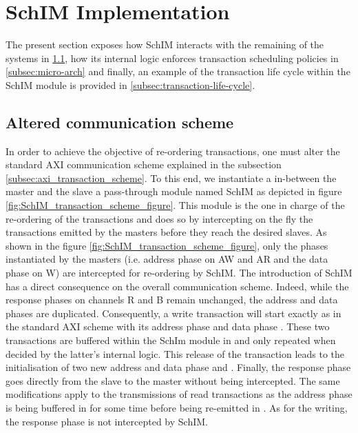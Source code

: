 \section{SchIM Implementation}
    \label{sec:schim_implmentation}

    The present section exposes how SchIM interacts with the remaining of the systems in \ref{subsec:communication-scheme}, how its internal logic enforces transaction scheduling policies in \ref{subsec:micro-arch} and finally, an example of the transaction life cycle within the SchIM module is provided in \ref{subsec:transaction-life-cycle}.

    \subsection{Altered communication scheme}
        \label{subsec:communication-scheme}
        In order to achieve the objective of re-ordering transactions, one must alter the standard AXI communication scheme explained in the subsection \ref{subsec:axi_transaction_scheme}.
        To this end, we instantiate a in-between the master and the slave a pass-through module named SchIM as depicted in figure \ref{fig:SchIM_transaction_scheme_figure}.
        This module is the one in charge of the re-ordering of the transactions and does so by intercepting on the fly the transactions emitted by the masters before they reach the desired slaves.
        As shown in the figure \ref{fig:SchIM_transaction_scheme_figure}, only the phases instantiated by the masters (i.e. address phase on AW and AR and the data phase on W) are intercepted for re-ordering by SchIM.
        The introduction of SchIM has a direct consequence on the overall communication scheme. Indeed, while the response phases on channels R and B remain unchanged, the address and data phases are duplicated.
        Consequently, a write transaction will start exactly as in the standard AXI scheme with its address phase  and data phase .
        These two transactions are buffered within the SchIm module in  and only repeated when decided by the latter's internal logic.
        This release of the transaction leads to the initialisation of two new address and data phase  and .
        Finally, the response phase  goes directly from the slave to the master without being intercepted.
        The same modifications apply to the transmissions of read transactions as the address phase  is being buffered in  for some time before being re-emitted in .
        As for the writing, the response phase  is not intercepted by SchIM.

